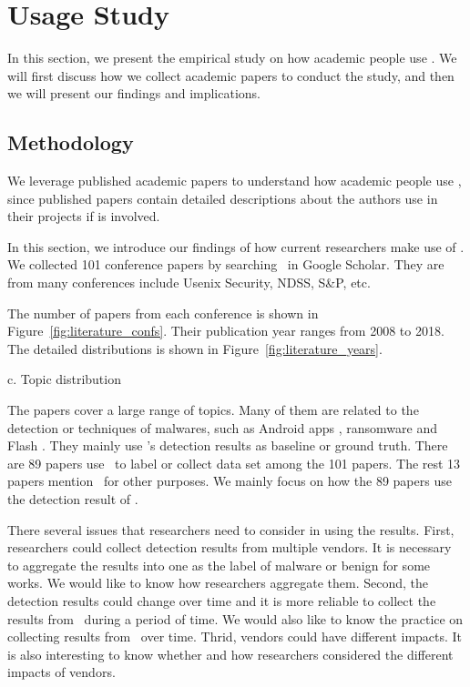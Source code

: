 \section{\vt Usage Study}

In this section, we present the empirical study on how 
academic people use \vt. 
We will first discuss how we collect academic papers to conduct the study, 
and then we will present our findings and implications. 

\subsection{Methodology}

We leverage published academic papers to understand 
how academic people use \vt,
since published papers contain detailed descriptions 
about the authors use \vt in their projects if \vt is involved. 





In this section, we introduce our findings of how current researchers make use of \vt. 
We collected 101 conference papers by searching \vt\ in Google Scholar. 
They are from many conferences include Usenix Security, NDSS, S\&P, etc. 

%

The number of papers from each conference is shown in Figure~\ref{fig:literature_confs}. 
Their publication year ranges from 2008 to 2018. The detailed distributions is shown in Figure~\ref{fig:literature_years}.

c. Topic distribution 

The papers cover a large range of topics. 
Many of them are related to the detection or techniques of malwares, such as Android apps \cite{arp2014drebin,huangvt2016bigdata}, ransomware \cite{kharraz2016unveil} and Flash \cite{ford2009analyzing}. 
They mainly use \vt's detection results as baseline or ground truth. 
There are 89 papers use \vt\ to label or collect data set among the 101 papers. 
The rest 13 papers mention \vt\ for other purposes. 
We mainly focus on how the 89 papers use the detection result of \vt.

There several issues that researchers need to consider in using the results. 
First, researchers could collect detection results from multiple vendors. 
It is necessary to aggregate the results into one as the label of malware or benign for some works. 
We would like to know how researchers aggregate them. 
Second, the detection results could change over time and it is more reliable to collect the results from \vt\ during a period of time. 
We would also like to know the practice on collecting results from \vt\ over time. 
Thrid, vendors could have different impacts. 
It is also interesting to know whether and how researchers considered the different impacts of vendors.

